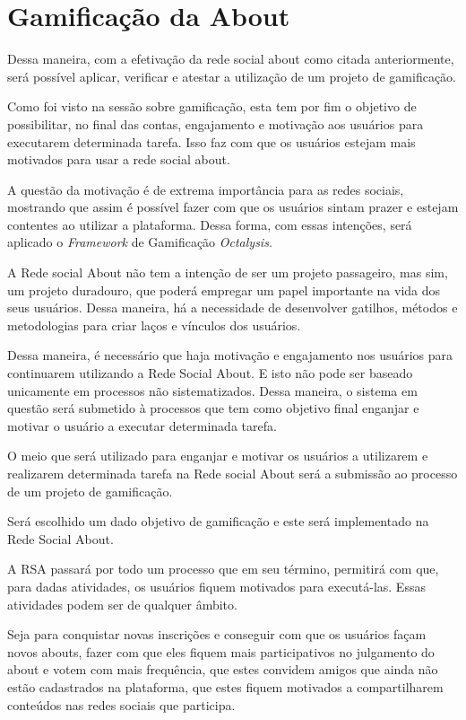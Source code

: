 \section{Gamificação da About}
\label{sub:gamifição}
Dessa maneira, com a efetivação da rede social about como citada anteriormente, será possível aplicar, verificar e
atestar a utilização de um projeto de gamificação.

Como foi visto na sessão sobre gamificação, esta tem por fim o objetivo de 
possibilitar, no final das contas, engajamento e motivação aos usuários para
executarem determinada tarefa. Isso faz com que os usuários estejam mais
motivados para usar a rede social about. 

A questão da motivação é de extrema importância para as redes sociais, mostrando
que assim é possível fazer com que os usuários sintam prazer e estejam
contentes ao utilizar a plataforma. Dessa forma, com essas intenções,
será aplicado o \textit{Framework} de Gamificação \textit{Octalysis}.

A Rede social About não tem a intenção de ser um projeto passageiro, mas sim,
um projeto duradouro, que poderá empregar um papel importante na vida dos
seus usuários. Dessa maneira, há a necessidade de desenvolver gatilhos, métodos
e metodologias para criar laços e vínculos dos usuários.

Dessa maneira, é necessário que haja motivação e engajamento nos usuários para 
continuarem utilizando a Rede Social About. E isto não pode ser baseado unicamente
em processos não sistematizados. Dessa maneira, o sistema em questão será
submetido à processos que tem como objetivo final enganjar e motivar o usuário
a executar determinada tarefa.

O meio que será utilizado para enganjar e motivar os usuários a utilizarem e
realizarem determinada tarefa na Rede social About será a submissão ao processo
de um projeto de gamificação. 

Será escolhido um dado objetivo de gamificação e este será implementado na Rede
Social About.

A RSA passará por todo um processo que em seu término, permitirá com que,
para dadas atividades, os usuários fiquem motivados para executá-las. Essas
atividades podem ser de qualquer âmbito. 

Seja para conquistar novas inscrições e
conseguir com que os usuários façam novos abouts, fazer com que eles fiquem mais
participativos no julgamento do about e votem com mais frequência, que estes
convidem amigos que ainda não estão cadastrados na plataforma, que estes fiquem
motivados a compartilharem conteúdos nas redes sociais que participa.

